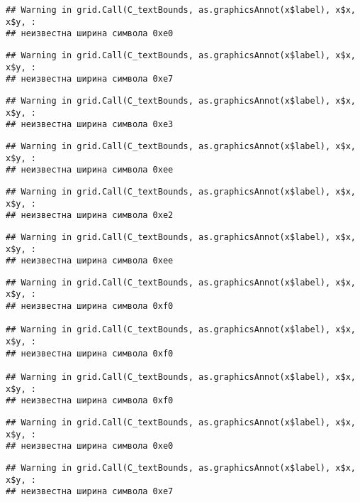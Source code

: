 \documentclass[
]{article}
\begin{document}
\begin{verbatim}
## Warning in grid.Call(C_textBounds, as.graphicsAnnot(x$label), x$x, x$y, :
## неизвестна ширина символа 0xe0
\end{verbatim}

\begin{verbatim}
## Warning in grid.Call(C_textBounds, as.graphicsAnnot(x$label), x$x, x$y, :
## неизвестна ширина символа 0xe7
\end{verbatim}

\begin{verbatim}
## Warning in grid.Call(C_textBounds, as.graphicsAnnot(x$label), x$x, x$y, :
## неизвестна ширина символа 0xe3
\end{verbatim}

\begin{verbatim}
## Warning in grid.Call(C_textBounds, as.graphicsAnnot(x$label), x$x, x$y, :
## неизвестна ширина символа 0xee
\end{verbatim}

\begin{verbatim}
## Warning in grid.Call(C_textBounds, as.graphicsAnnot(x$label), x$x, x$y, :
## неизвестна ширина символа 0xe2
\end{verbatim}

\begin{verbatim}
## Warning in grid.Call(C_textBounds, as.graphicsAnnot(x$label), x$x, x$y, :
## неизвестна ширина символа 0xee
\end{verbatim}

\begin{verbatim}
## Warning in grid.Call(C_textBounds, as.graphicsAnnot(x$label), x$x, x$y, :
## неизвестна ширина символа 0xf0

## Warning in grid.Call(C_textBounds, as.graphicsAnnot(x$label), x$x, x$y, :
## неизвестна ширина символа 0xf0

## Warning in grid.Call(C_textBounds, as.graphicsAnnot(x$label), x$x, x$y, :
## неизвестна ширина символа 0xf0
\end{verbatim}

\begin{verbatim}
## Warning in grid.Call(C_textBounds, as.graphicsAnnot(x$label), x$x, x$y, :
## неизвестна ширина символа 0xe0
\end{verbatim}

\begin{verbatim}
## Warning in grid.Call(C_textBounds, as.graphicsAnnot(x$label), x$x, x$y, :
## неизвестна ширина символа 0xe7
\end{verbatim}
\end{document}
